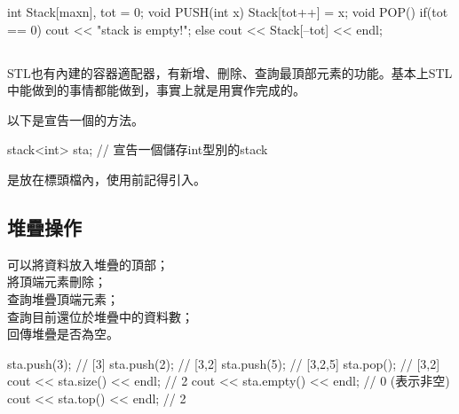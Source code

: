 \begin{C++}
int Stack[maxn], tot = 0;
void PUSH(int x) {
    Stack[tot++] = x;
}
void POP(){
    if(tot == 0)
        cout << "stack is empty!\n";
    else
        cout << Stack[--tot] << endl;
}
\end{C++}
\subsection{}
STL也有內建的容器適配器，有新增、刪除、查詢最頂部元素的功能。基本上STL中能做到的事情都能做到，事實上就是用實作完成的。\\


以下是宣告一個的方法。
\begin{C++}
stack<int> sta; // 宣告一個儲存int型別的stack
\end{C++}
\indent {}是放在標頭檔內，使用前記得引入。

\subsection{堆疊操作}
 可以將資料放入堆疊的頂部；\\
\indent{} 將頂端元素刪除；\\
\indent{} 查詢堆疊頂端元素；\\
\indent{} 查詢目前還位於堆疊中的資料數；\\
\indent{} 回傳堆疊是否為空。
\begin{C++}
sta.push(3); // [3]
sta.push(2); // [3,2]
sta.push(5); // [3,2,5]
sta.pop(); // [3,2]
cout << sta.size() << endl; // 2
cout << sta.empty() << endl; // 0 (表示非空)
cout << sta.top() << endl; // 2
\end{C++}

